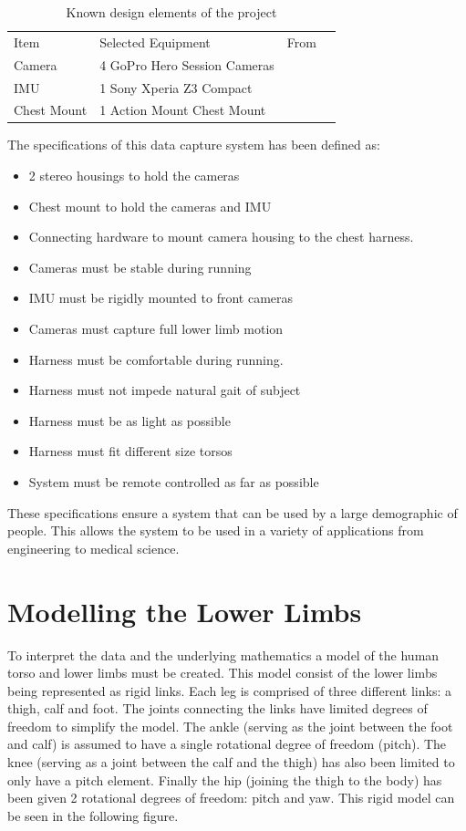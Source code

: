\begin{table}[!ht]
\label{equipment-table}
\begin{tabular}{llll}
Item		& Selected Equipment				& From	\\
Camera      & 4 GoPro Hero Session Cameras  & \cite{gopro}\\
IMU         & 1 Sony Xperia Z3 Compact      & \cite{sony}\\
Chest Mount & 1 Action Mount Chest Mount    & \cite{actionmounts}   
\end{tabular}
\caption{Known design elements of the project}
\end{table}

The specifications of this data capture system has been defined as:

\begin{itemize}
\item 2 stereo housings to hold the cameras
\item Chest mount to hold the cameras and IMU
\item Connecting hardware to mount camera housing to the chest harness.
\item Cameras must be stable during running
\item IMU must be rigidly mounted to front cameras
\item Cameras must capture full lower limb motion
\item Harness must be comfortable during running.
\item Harness must not impede natural gait of subject
\item Harness must be as light as possible
\item Harness must fit different size torsos
\item System must be remote controlled as far as possible 
\end{itemize}

These specifications ensure a system that can be used by a large demographic of people. This allows the system to be used in a variety of applications from engineering to medical science.

\section{Modelling the Lower Limbs}
To interpret the data and the underlying mathematics a model of the human torso and lower limbs must be created. This model consist of the lower limbs being represented as rigid links. Each leg is comprised of three different links: a thigh, calf and foot. The joints connecting the links have limited degrees of freedom to simplify the model. The ankle (serving as the joint between the foot and calf) is assumed to have a single rotational degree of freedom (pitch). The knee (serving as a joint between the calf and the thigh) has also been limited to only have a pitch element. Finally the hip (joining the thigh to the body) has been given 2 rotational degrees of freedom: pitch and yaw. This rigid model can be seen in the following figure.

